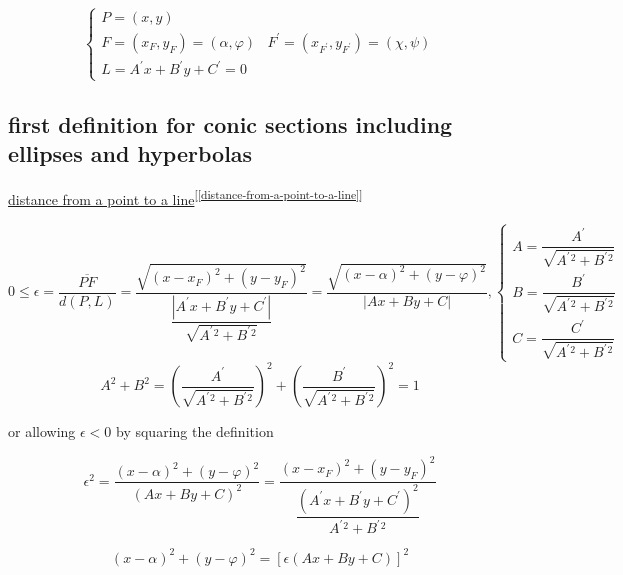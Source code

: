 \documentclass[
]{book}
\theoremstyle{definition}
\theoremstyle{definition}
\theoremstyle{definition}
\theoremstyle{definition}
\theoremstyle{remark}
\begin{document}
\[
\begin{cases}
P=\left(x,y\right)\\
F=\left(x_{{\scriptscriptstyle F}},y_{{\scriptscriptstyle F}}\right)=\left(\alpha,\varphi\right) & F^{\prime}=\left(x_{{\scriptscriptstyle F^{\prime}}},y_{{\scriptscriptstyle F^{\prime}}}\right)=\left(\chi,\psi\right)\\
L=A^{\prime}x+B^{\prime}y+C^{\prime}=0
\end{cases}
\]

\hypertarget{first-definition-for-conic-sections-including-ellipses-and-hyperbolas}{%
\subsection{first definition for conic sections including ellipses and hyperbolas}\label{first-definition-for-conic-sections-including-ellipses-and-hyperbolas}}

\protect\hyperlink{distance-from-a-point-to-a-line}{distance from a point to a line}\textsuperscript{{[}\ref{distance-from-a-point-to-a-line}{]}}

\[
0\le\epsilon=\dfrac{\overline{PF}}{d\left(P,L\right)}=\dfrac{\sqrt{\left(x-x_{{\scriptscriptstyle F}}\right)^{2}+\left(y-y_{{\scriptscriptstyle F}}\right)^{2}}}{\dfrac{\left|A^{\prime}x+B^{\prime}y+C^{\prime}\right|}{\sqrt{A^{\prime}{}^{2}+B^{\prime}{}^{2}}}}=\dfrac{\sqrt{\left(x-\alpha\right)^{2}+\left(y-\varphi\right)^{2}}}{\left|Ax+By+C\right|},\begin{cases}
A=\dfrac{A^{\prime}}{\sqrt{A^{\prime}{}^{2}+B^{\prime}{}^{2}}}\\
B=\dfrac{B^{\prime}}{\sqrt{A^{\prime}{}^{2}+B^{\prime}{}^{2}}}\\
C=\dfrac{C^{\prime}}{\sqrt{A^{\prime}{}^{2}+B^{\prime}{}^{2}}}
\end{cases}
\]
\[
A^{2}+B^{2}=\left(\dfrac{A^{\prime}}{\sqrt{A^{\prime}{}^{2}+B^{\prime}{}^{2}}}\right)^{2}+\left(\dfrac{B^{\prime}}{\sqrt{A^{\prime}{}^{2}+B^{\prime}{}^{2}}}\right)^{2}=1
\]

or allowing \(\epsilon<0\) by squaring the definition

\[
\epsilon^{2}=\dfrac{\left(x-\alpha\right)^{2}+\left(y-\varphi\right)^{2}}{\left(Ax+By+C\right)^{2}}=\dfrac{\left(x-x_{{\scriptscriptstyle F}}\right)^{2}+\left(y-y_{{\scriptscriptstyle F}}\right)^{2}}{\dfrac{\left(A^{\prime}x+B^{\prime}y+C^{\prime}\right)^{2}}{A^{\prime}{}^{2}+B^{\prime}{}^{2}}}
\]

\[
\left(x-\alpha\right)^{2}+\left(y-\varphi\right)^{2}=\left[\epsilon\left(Ax+By+C\right)\right]^{2}
\]
\end{document}
